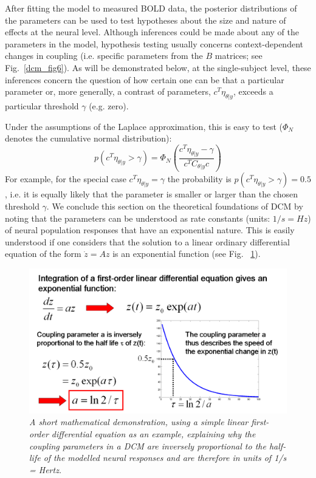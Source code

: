 After fitting the model to measured BOLD data, the posterior distributions of the parameters can be used to test hypotheses about the size and nature of effects at the neural level.  Although inferences could be made about any of the parameters in the model, hypothesis testing usually concerns context-dependent changes in coupling (i.e. specific parameters from the $B$ matrices; see Fig.~\ref{dcm_fig6}).  As will be demonstrated below, at the single-subject level, these inferences concern the question of how certain one can be that a particular parameter or, more generally, a contrast of parameters, $c^T \eta_{\theta | y}$, exceeds a particular threshold  $\gamma$ (e.g. zero).

Under the assumptions of the Laplace approximation, this is easy to test ($\Phi_N$ denotes the cumulative normal distribution):
\begin{equation}
p(c^T \eta_{\theta | y} > \gamma) = \Phi_N \left(\frac{c^T \eta_{\theta | y} - \gamma}{c^T C_{\theta | y} c} \right)
\end{equation}
For example, for the special case $c^T \eta_{\theta | y} = \gamma$ the probability is $p(c^T \eta_{\theta | y} > \gamma)=0.5$, i.e. it is equally likely that the parameter is smaller or larger than the chosen threshold $\gamma$.
We conclude this section on the theoretical foundations of DCM by noting that the parameters can be understood as rate constants (units: $1/s = Hz$) of neural population responses that have an exponential nature.  This is easily understood if one considers that the solution to a linear ordinary differential equation of the form $\dot{z}=Az$ is an exponential function (see Fig. ~\ref{dcm_fig3}).
\begin{figure}[ht]
\begin{center}
\includegraphics[width=120mm]{dcm/Fig3}
\caption{\em A short mathematical demonstration, using a simple linear first-order differential equation as an example, explaining why the coupling parameters in a DCM are inversely proportional to the half-life of the modelled neural responses and are therefore in units of 1/s = Hertz.\label{dcm_fig3}}
\end{center}
\end{figure}

